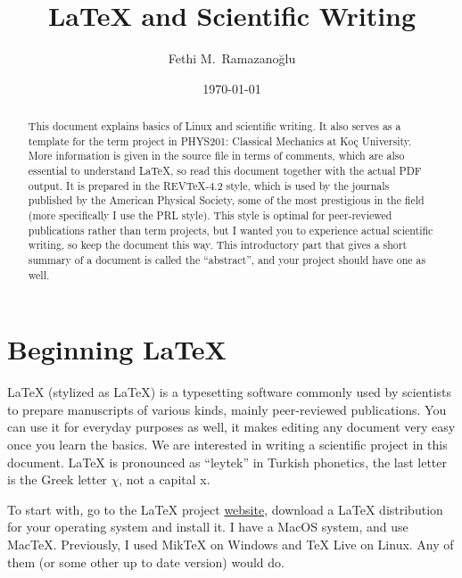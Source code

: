 \documentclass[aps,twocolumn,showpacs,preprintnumbers,nofootinbib,prl,superscriptaddress,groupedaddress]{revtex4-2}
\begin{document}
\title{LaTeX and Scientific Writing}
\author{Fethi M.\ Ramazano\u{g}lu} %
\date{\today}

\begin{abstract}
This document explains basics of Linux and scientific writing. It also serves
as a template for the term project in PHYS201: Classical Mechanics at Ko\c{c}
University. More information is given in the source file in terms of comments, 
which are also essential to understand LaTeX, so read this document together 
with the actual PDF output. It is prepared in the REVTeX-4.2 style, which is used by the 
journals published by the American Physical Society, some of the most
prestigious in the field (more specifically I use the PRL style).
This style is optimal for peer-reviewed publications
rather than term projects, but I wanted you to experience actual scientific
writing, so keep the document this way. This introductory part that gives
a short summary of a document is called the ``abstract'', and your project
should have one as well.
\end{abstract}
\maketitle


\section{Beginning LaTeX}\label{intro}
LaTeX (stylized as \LaTeX) is a typesetting software commonly used by scientists to prepare manuscripts of various
kinds, mainly
peer-reviewed publications. You can use it for everyday purposes as well, it makes editing any
document very easy once you learn the basics. We are interested in writing a scientific project in this document.
LaTeX is pronounced as ``leytek'' in Turkish phonetics, the last letter is the Greek letter $\chi$, not a capital x.

To start with, go to the LaTeX project \href{https://www.latex-project.org/get/}{website}, download a LaTeX
distribution for your operating system and install it. I have a MacOS system, and use MacTeX.
Previously, I used MikTeX on Windows and TeX Live on Linux. Any of them (or some other up to date
version) would do.
\end{document}
